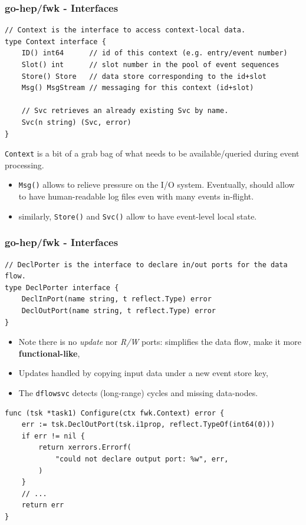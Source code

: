 \documentclass[9pt]{beamer}
\begin{document}
\begin{frame}[fragile]
\frametitle{go-hep/fwk - Interfaces}


\begin{verbatim}
// Context is the interface to access context-local data.
type Context interface {
	ID() int64      // id of this context (e.g. entry/event number)
	Slot() int      // slot number in the pool of event sequences
	Store() Store   // data store corresponding to the id+slot
	Msg() MsgStream // messaging for this context (id+slot)

	// Svc retrieves an already existing Svc by name.
	Svc(n string) (Svc, error)
}

\end{verbatim}

\texttt{Context} is a bit of a grab bag of what needs to be available/queried during event processing.


\begin{itemize}
\item \texttt{Msg()} allows to relieve pressure on the I/O system. Eventually, should allow to have human-readable log files even with many events in-flight.
\end{itemize}

\begin{itemize}
\item similarly, \texttt{Store()} and \texttt{Svc()} allow to have event-level local state.
\end{itemize}


\end{frame}

\begin{frame}[fragile]
\frametitle{go-hep/fwk - Interfaces}


\begin{verbatim}
// DeclPorter is the interface to declare in/out ports for the data flow.
type DeclPorter interface {
	DeclInPort(name string, t reflect.Type) error
	DeclOutPort(name string, t reflect.Type) error
}

\end{verbatim}

\begin{itemize}
\item Note there is no \emph{update} nor \emph{R/W} ports: simplifies the data flow, make it more \textbf{functional-like},
\item Updates handled by copying input data under a new event store key,
\item The \texttt{dflowsvc} detects (long-range) cycles and missing data-nodes.
\end{itemize}

\begin{verbatim}
func (tsk *task1) Configure(ctx fwk.Context) error {
	err := tsk.DeclOutPort(tsk.i1prop, reflect.TypeOf(int64(0)))
	if err != nil {
		return xerrors.Errorf(
			"could not declare output port: %w", err,
		)
	}
	// ...
	return err
}

\end{verbatim}


\end{frame}
\end{document}
